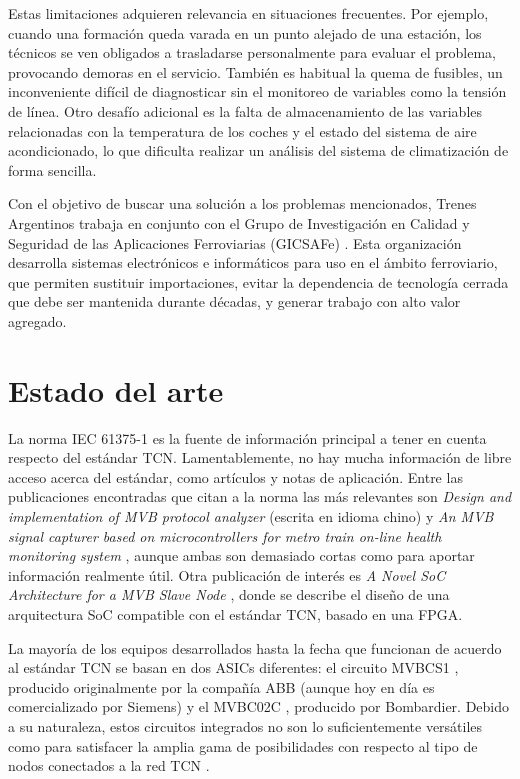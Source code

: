 Estas limitaciones adquieren relevancia en situaciones frecuentes.
Por ejemplo, cuando una formación queda varada en un punto alejado de una estación, los técnicos se ven obligados a trasladarse personalmente para evaluar el problema, provocando demoras en el servicio.
También es habitual la quema de fusibles, un inconveniente difícil de diagnosticar sin el monitoreo de variables como la tensión de línea.
Otro desafío adicional es la falta de almacenamiento de las variables relacionadas con la temperatura de los coches y el estado del sistema de aire acondicionado, lo que dificulta realizar un análisis del sistema de climatización de forma sencilla.

Con el objetivo de buscar una solución a los problemas mencionados, Trenes Argentinos trabaja en conjunto con el Grupo de Investigación en Calidad y Seguridad de las Aplicaciones Ferroviarias (GICSAFe) \cite{web:gicsafe}. Esta organización desarrolla sistemas electrónicos e informáticos para uso en el ámbito ferroviario, que permiten sustituir importaciones, evitar la dependencia de tecnología cerrada que debe ser mantenida durante décadas, y generar trabajo con alto valor agregado.

\section{Estado del arte}

\label{estadodelarte}

La norma IEC 61375-1 es la fuente de información principal a tener en cuenta respecto del estándar TCN. Lamentablemente, no hay mucha información de libre acceso acerca del estándar, como artículos y notas de aplicación. Entre las publicaciones encontradas que citan a la norma las más relevantes son \textit{Design and implementation of MVB protocol analyzer} \cite{mvb-pub-1} (escrita en idioma chino) y \textit{An MVB signal capturer based on microcontrollers for metro train on-line health monitoring system} \cite{mvb-pub-2}, aunque ambas son demasiado cortas como para aportar información realmente útil.
Otra publicación de interés es \textit{A Novel SoC Architecture for a MVB Slave Node} \cite{mvb-pub-3}, donde se describe el diseño de una arquitectura SoC compatible con el estándar TCN, basado en una FPGA.

La mayoría de los equipos desarrollados hasta la fecha que funcionan de acuerdo al estándar TCN se basan en dos ASICs diferentes: el circuito MVBCS1 \cite{mvbcs1}, producido originalmente por la compañía ABB (aunque hoy en día es comercializado por Siemens) y el MVBC02C \cite{mvbc02c}, producido por Bombardier. Debido a su naturaleza, estos circuitos integrados no son lo suficientemente versátiles como para satisfacer la amplia gama de posibilidades con respecto al tipo de nodos conectados a la red TCN \cite{mvb-pub-3}.

